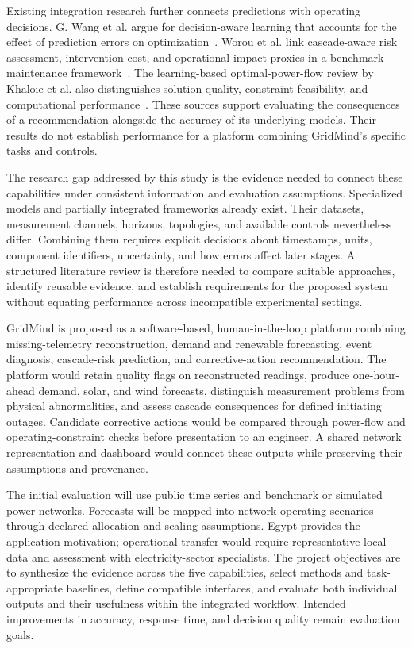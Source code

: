 \documentclass[journal,letterpaper]{IEEEtran}
\begin{document}
Existing integration research further connects predictions with operating decisions. G. Wang et al. argue for decision-aware learning that accounts for the effect of prediction errors on optimization~\cite{S37}. Worou et al. link cascade-aware risk assessment, intervention cost, and operational-impact proxies in a benchmark maintenance framework~\cite{S38}. The learning-based optimal-power-flow review by Khaloie et al. also distinguishes solution quality, constraint feasibility, and computational performance~\cite{S05}. These sources support evaluating the consequences of a recommendation alongside the accuracy of its underlying models. Their results do not establish performance for a platform combining GridMind's specific tasks and controls.

The research gap addressed by this study is the evidence needed to connect these capabilities under consistent information and evaluation assumptions. Specialized models and partially integrated frameworks already exist. Their datasets, measurement channels, horizons, topologies, and available controls nevertheless differ. Combining them requires explicit decisions about timestamps, units, component identifiers, uncertainty, and how errors affect later stages. A structured literature review is therefore needed to compare suitable approaches, identify reusable evidence, and establish requirements for the proposed system without equating performance across incompatible experimental settings.

GridMind is proposed as a software-based, human-in-the-loop platform combining missing-telemetry reconstruction, demand and renewable forecasting, event diagnosis, cascade-risk prediction, and corrective-action recommendation. The platform would retain quality flags on reconstructed readings, produce one-hour-ahead demand, solar, and wind forecasts, distinguish measurement problems from physical abnormalities, and assess cascade consequences for defined initiating outages. Candidate corrective actions would be compared through power-flow and operating-constraint checks before presentation to an engineer. A shared network representation and dashboard would connect these outputs while preserving their assumptions and provenance.

The initial evaluation will use public time series and benchmark or simulated power networks. Forecasts will be mapped into network operating scenarios through declared allocation and scaling assumptions. Egypt provides the application motivation; operational transfer would require representative local data and assessment with electricity-sector specialists. The project objectives are to synthesize the evidence across the five capabilities, select methods and task-appropriate baselines, define compatible interfaces, and evaluate both individual outputs and their usefulness within the integrated workflow. Intended improvements in accuracy, response time, and decision quality remain evaluation goals.
\end{document}
